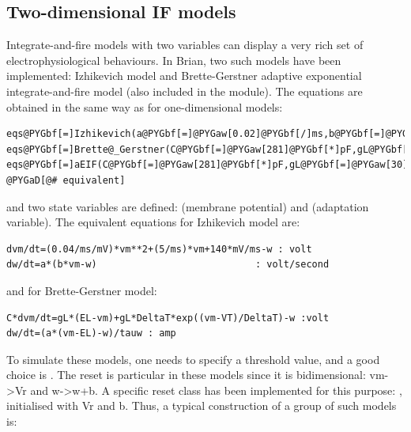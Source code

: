 \documentclass[letterpaper,10pt,english]{manual}
\begin{document}
\subsection{Two-dimensional IF models}

Integrate-and-fire models with two variables can display a very rich set of electrophysiological behaviours.
In Brian, two such models have been implemented: Izhikevich model and Brette-Gerstner adaptive exponential
integrate-and-fire model (also included in the  module).
The equations are obtained in the same way as for one-dimensional models:

\begin{Verbatim}[commandchars=@\[\]]
eqs@PYGbf[=]Izhikevich(a@PYGbf[=]@PYGaw[0.02]@PYGbf[/]ms,b@PYGbf[=]@PYGaw[0.2]@PYGbf[/]ms)
eqs@PYGbf[=]Brette@_Gerstner(C@PYGbf[=]@PYGaw[281]@PYGbf[*]pF,gL@PYGbf[=]@PYGaw[30]@PYGbf[*]nS,EL@PYGbf[=]@PYGbf[-]@PYGaw[70.6]@PYGbf[*]mV,VT@PYGbf[=]@PYGbf[-]@PYGaw[50.4]@PYGbf[*]mV,DeltaT@PYGbf[=]@PYGaw[2]@PYGbf[*]mV,tauw@PYGbf[=]@PYGaw[144]@PYGbf[*]ms,a@PYGbf[=]@PYGaw[4]@PYGbf[*]nS)
eqs@PYGbf[=]aEIF(C@PYGbf[=]@PYGaw[281]@PYGbf[*]pF,gL@PYGbf[=]@PYGaw[30]@PYGbf[*]nS,EL@PYGbf[=]@PYGbf[-]@PYGaw[70.6]@PYGbf[*]mV,VT@PYGbf[=]@PYGbf[-]@PYGaw[50.4]@PYGbf[*]mV,DeltaT@PYGbf[=]@PYGaw[2]@PYGbf[*]mV,tauw@PYGbf[=]@PYGaw[144]@PYGbf[*]ms,a@PYGbf[=]@PYGaw[4]@PYGbf[*]nS) @PYGaD[@# equivalent]
\end{Verbatim}

and two state variables are defined:  (membrane potential) and  (adaptation variable).
The equivalent equations for Izhikevich model are:

\begin{Verbatim}[commandchars=@\[\]]
dvm/dt=(0.04/ms/mV)*vm**2+(5/ms)*vm+140*mV/ms-w : volt
dw/dt=a*(b*vm-w)                            : volt/second
\end{Verbatim}

and for Brette-Gerstner model:

\begin{Verbatim}[commandchars=@\[\]]
C*dvm/dt=gL*(EL-vm)+gL*DeltaT*exp((vm-VT)/DeltaT)-w :volt
dw/dt=(a*(vm-EL)-w)/tauw : amp
\end{Verbatim}

To simulate these models, one needs to specify a threshold value, and a good choice is
. The reset is particular in these models since it is bidimensional:
vm-\textgreater{}Vr and w-\textgreater{}w+b. A specific reset class has been implemented for this purpose:
, initialised with Vr and b. Thus, a typical construction of a group of
such models is:
\end{document}
